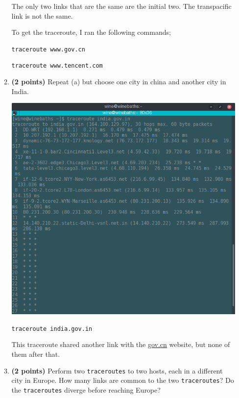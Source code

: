 \documentclass{article}
\begin{document}
\begin{enumerate}
\begin{enumerate}
The only two links that are the same are the initial two. The transpacific link is not the same.

To get the traceroute, I ran the following commands;

\texttt{traceroute www.gov.cn}

\texttt{traceroute www.tencent.com}

\item \textbf{(2 points)} Repeat (a) but choose one city in china and another city in India.

\includegraphics[scale=0.5]{in1.png}

\texttt{traceroute india.gov.in}

This traceroute shared another link with the \url{gov.cn} website, but none of them after that.

\item \textbf{(2 points)} Perform two \texttt{traceroutes} to two hosts, each in a different city in Europe. How many links are common to the two \texttt{traceroutes}? Do the \texttt{traceroutes} diverge before reaching Europe?


\end{enumerate}
\end{enumerate}
\end{document}
